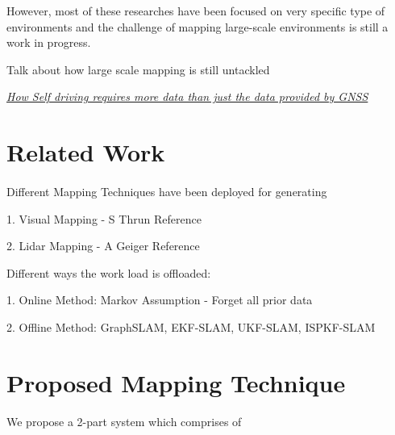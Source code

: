 \documentclass{article}
\begin{document}
	However, most of these researches have been focused on very specific type of environments and the challenge of mapping large-scale environments is still a work in progress.
	
	
	Talk about how large scale mapping is still untackled
	
	

	\begin{comment}
	Autonomous vehicles require more information that the standard 2D map provides. It needs to understand when and where to look for traffic signals, speed limits. Even to perform a simple task like taking a turn, the autonomous vehicle requires information like where the turn only lane starts which isn't provided in standard maps. Hence we need maps that have more data that simple latitude and longitudinal data.
	Perception and navigation in complex environment requires a well defined map of the environment. LiDAR is usually used to generate a map of the environment using the 3D point cloud data. Camera's do not directly provide a depth perception but can be extremely efficient in image classification and obstacle detection.
	\end{comment}
	
	\underline{\textit{How Self driving requires more data than just the data provided by GNSS}}
	
	\section{Related Work}
	\paragraph{}
	Different Mapping Techniques have been deployed for generating
	
	1. Visual Mapping - S Thrun Reference 
	
	2. Lidar Mapping - A Geiger Reference 
	
	Different ways the work load is offloaded:
	
	1. Online Method: Markov Assumption - Forget all prior data
	
	2. Offline Method: GraphSLAM, EKF-SLAM, UKF-SLAM, ISPKF-SLAM
	
	\section{Proposed Mapping Technique}
	
	We propose a 2-part system which comprises of
	
\end{document}
